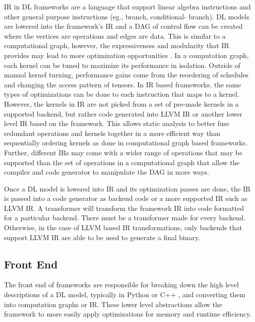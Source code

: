 IR in DL frameworks are a language that support linear algebra instructions and
other general purpose instructions (eg., branch, conditional- branch). DL
models are lowered into the framework's IR and a DAG of control flow
\cite{nGraph} can be created where the vertices are operations and edges are
data. This is similar to a computational graph, however, the expressiveness and
modularity that IR provides may lead to more optimization opportunities
\cite{DLVM}. In a computation graph, each kernel can be tuned to maximize its
performance in isolation. Outside of manual kernel turning, performance gains
come from the reordering of schedules and changing the access pattern of
tensors.  In IR based frameworks, the same types of optimizations can be done
to each instruction that maps to a kernel. However, the kernels in IR are not
picked from a set of pre-made kernels in a supported backend, but rather code
generated into LLVM IR or another lower level IR based on the framework. This
allows static analysis to better fuse redundant operations and kernels together
in a more efficient way than sequentially ordering kernels as done in
computational graph based frameworks. Further, different IRs may come with
a wider range of operations that may be supported than the set of operations in
a computational graph that allow the compiler and code generator to manipulate
the DAG in more ways.

Once a DL model is lowered into IR and its optimization passes are done, the IR
is passed into a code generator as backend code or a more supported IR such as
LLVM IR. A transformer will transform the framework IR into code formatted for
a particular backend. There must be a transformer made for every backend. Otherwise,
in the case of LLVM based IR transformations, only backends that support LLVM
IR are able to be used to generate a final binary.
\subsection{Front End}
The front end of frameworks are responsible for breaking down the high level
descriptions of a DL model, typically in Python or C++ \cite{tensorflow}, and
converting them into computation graphs or IR. These lower level abstractions
allow the framework to more easily apply optimizations for memory and runtime
efficiency. 

